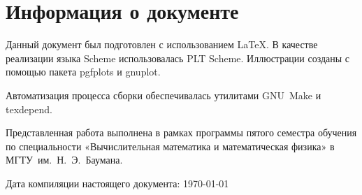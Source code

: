 \documentclass{article}
\newcommand{\program}[1]{{\sf #1}}
\theoremstyle{ruthm}
\numberwithin{thm}{section}
\theoremstyle{rurem}
\theoremstyle{rudfn}
\numberwithin{equation}{section}
\begin{document}
\clearpage
\section{Информация о документе}

Данный документ был подготовлен с использованием \LaTeX{}. В качестве
реализации языка Scheme использовалась \program{PLT Scheme}.
Иллюстрации созданы с помощью пакета \program{pgfplots} и
\program{gnuplot}.

Автоматизация процесса сборки обеспечивалась утилитами
\program{GNU Make} и \program{texdepend}.

Представленная работа выполнена в рамках программы пятого семестра
обучения по специальности «Вычислительная математика и математическая
физика» в МГТУ им. Н. Э. Баумана.

Дата компиляции настоящего документа: \today



\end{document}
